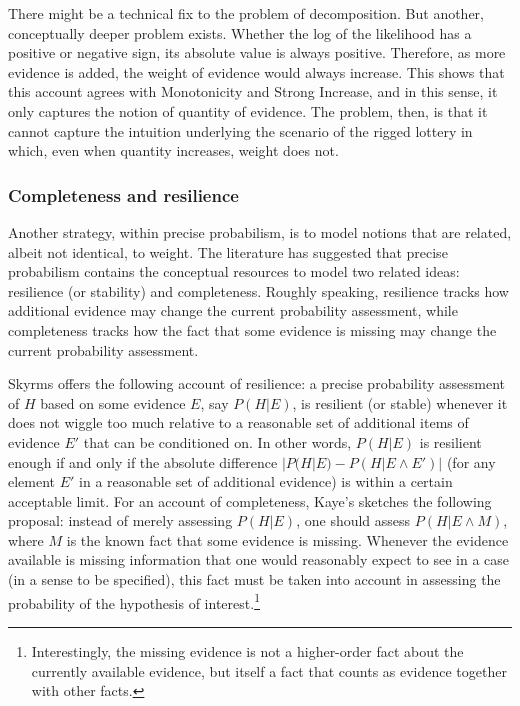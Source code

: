 \documentclass[
  10pt,
  dvipsnames,enabledeprecatedfontcommands]{scrartcl}
\begin{document}
There might be a technical fix to the problem of decomposition. But
another, conceptually deeper problem exists. Whether the log of the
likelihood has a positive or negative sign, its absolute value is always
positive. Therefore, as more evidence is added, the weight of evidence
would always increase. This shows that this account agrees with
Monotonicity and Strong Increase, and in this sense, it only captures
the notion of quantity of evidence. The problem, then, is that it cannot
capture the intuition underlying the scenario of the rigged lottery in
which, even when quantity increases, weight does not.

\hypertarget{completeness-and-resilience}{%
\subsubsection{Completeness and
resilience}\label{completeness-and-resilience}}

Another strategy, within precise probabilism, is to model notions that
are related, albeit not identical, to weight. The literature has
suggested that precise probabilism contains the conceptual resources to
model two related ideas: resilience (or stability) and completeness.
Roughly speaking, resilience tracks how additional evidence may change
the current probability assessment, while completeness tracks how the
fact that some evidence is missing may change the current probability
assessment.

Skyrms  offers the following account of resilience: a
precise probability assessment of \(H\) based on some evidence \(E\),
say \(P(H \vert E)\), is resilient (or stable) whenever it does not
wiggle too much relative to a reasonable set of additional items of
evidence \(E'\) that can be conditioned on. In other words,
\(P(H \vert E)\) is resilient enough if and only if the absolute
difference \(| P(H | E) - P(H \vert E \wedge E')|\) (for any element
\(E'\) in a reasonable set of additional evidence) is within a certain
acceptable limit. For an account of completeness, Kaye's sketches the
following proposal: instead of merely assessing
\(P(H \vert E)\), one should assess \(P(H \vert E \wedge M)\), where
\(M\) is the known fact that some evidence is missing. Whenever the
evidence available is missing information that one would reasonably
expect to see in a case (in a sense to be specified), this fact must be
taken into account in assessing the probability of the hypothesis of
interest.\footnote{Interestingly, the missing evidence is not a
  higher-order fact about the currently available evidence, but itself a
  fact that counts as evidence together with other facts.}
\end{document}
